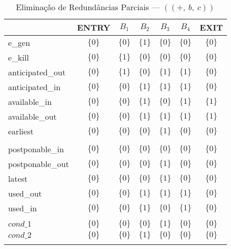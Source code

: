 \begin{table}[ht]
\centering
\begin{tabular}{l|c|c|c|c|c|c}
	& ENTRY & $B_{1}$ & $B_{2}$ & $B_{3}$ & $B_{4}$ & EXIT \\
\hline
e\_gen & $\{0\}$ & $\{0\}$ & $\{1\}$ & $\{0\}$ & $\{0\}$ & $\{0\}$ \\
e\_kill & $\{0\}$ & $\{1\}$ & $\{0\}$ & $\{0\}$ & $\{0\}$ & $\{0\}$ \\
anticipated\_out & $\{0\}$ & $\{1\}$ & $\{0\}$ & $\{1\}$ & $\{1\}$ & $\{0\}$ \\
anticipated\_in & $\{0\}$ & $\{0\}$ & $\{1\}$ & $\{1\}$ & $\{1\}$ & $\{0\}$ \\
available\_in & $\{0\}$ & $\{0\}$ & $\{1\}$ & $\{0\}$ & $\{1\}$ & $\{1\}$ \\
available\_out & $\{0\}$ & $\{0\}$ & $\{1\}$ & $\{1\}$ & $\{1\}$ & $\{1\}$ \\
earliest & $\{0\}$ & $\{0\}$ & $\{0\}$ & $\{1\}$ & $\{0\}$ & $\{0\}$ \\
 &  &  &  &  &  &  \\
postponable\_in & $\{0\}$ & $\{0\}$ & $\{0\}$ & $\{0\}$ & $\{0\}$ & $\{0\}$ \\
postponable\_out & $\{0\}$ & $\{0\}$ & $\{0\}$ & $\{1\}$ & $\{0\}$ & $\{0\}$ \\
latest & $\{0\}$ & $\{0\}$ & $\{0\}$ & $\{1\}$ & $\{0\}$ & $\{0\}$ \\
used\_out & $\{0\}$ & $\{0\}$ & $\{1\}$ & $\{1\}$ & $\{1\}$ & $\{0\}$ \\
used\_in & $\{0\}$ & $\{0\}$ & $\{1\}$ & $\{0\}$ & $\{1\}$ & $\{0\}$ \\
 &  &  &  &  &  &  \\
$cond\_1$ & $\{0\}$ & $\{0\}$ & $\{0\}$ & $\{1\}$ & $\{0\}$ & $\{0\}$ \\
$cond\_2$ & $\{0\}$ & $\{0\}$ & $\{1\}$ & $\{0\}$ & $\{0\}$ & $\{0\}$ \\
\\
\end{tabular}
\caption{Elimina\c{c}\~ao de Redund\^ancias Parciais --- $((+,\:b,\:c))$}
\end{table}



